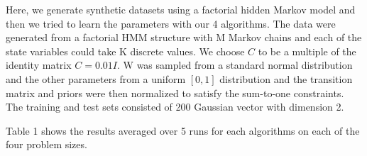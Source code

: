 \documentclass[10pt,a4paper]{report}
\begin{document}
	


Here, we generate synthetic datasets using a factorial hidden Markov model and then we tried to learn the parameters with our 4 algorithms. The data were generated from a factorial HMM structure with M Markov chains and each of the state variables could take K discrete values. We choose $C$ to be a multiple of the identity matrix $C = 0.01 I$. W was sampled from a standard normal distribution and the other parameters from a uniform $[0,1]$ distribution and the transition matrix and priors were then normalized to satisfy the sum-to-one constraints. The training and test sets consisted of 200 Gaussian vector with dimension 2. 

Table 1 shows the results averaged over 5 runs for each algorithms on each of the four problem sizes. 
\end{document}
